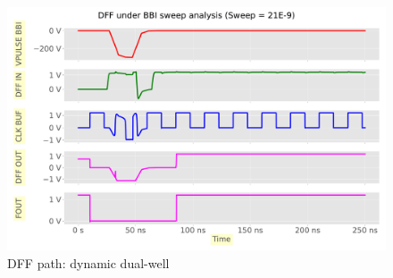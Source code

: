 
\begin{figure}[h]
	\centering
	\includegraphics[width=\columnwidth]{./figures/dff-pdf-dw-neg/anim0011.pdf}
	\caption{DFF path: dynamic dual-well}
	\label{dffdynamic-dw}
\end{figure}
